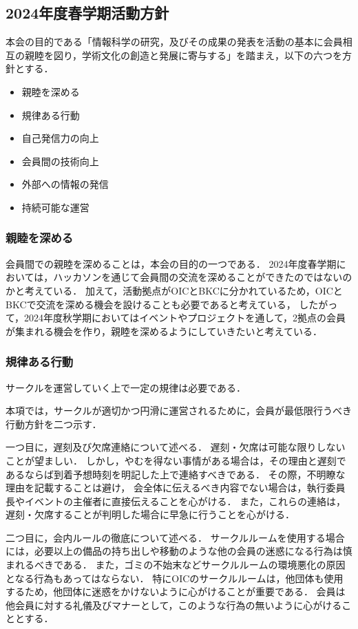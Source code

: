 \subsection*{2024年度春学期活動方針}


本会の目的である「情報科学の研究，及びその成果の発表を活動の基本に会員相互の親睦を図り，学術文化の創造と発展に寄与する」を踏まえ，以下の六つを方針とする．


\begin{itemize}
    \item 親睦を深める
    \item 規律ある行動
    \item 自己発信力の向上
    \item 会員間の技術向上
    \item 外部への情報の発信
    \item 持続可能な運営
\end{itemize}

\subsubsection*{親睦を深める}
会員間での親睦を深めることは，本会の目的の一つである．
2024年度春学期においては，ハッカソンを通じて会員間の交流を深めることができたのではないのかと考えている．
加えて，活動拠点がOICとBKCに分かれているため，OICとBKCで交流を深める機会を設けることも必要であると考えている，
したがって，2024年度秋学期においてはイベントやプロジェクトを通して，2拠点の会員が集まれる機会を作り，親睦を深めるようにしていきたいと考えている．

\subsubsection*{規律ある行動}
サークルを運営していく上で一定の規律は必要である．

本項では，サークルが適切かつ円滑に運営されるために，会員が最低限行うべき行動方針を二つ示す．

一つ目に，遅刻及び欠席連絡について述べる．
遅刻・欠席は可能な限りしないことが望ましい．
しかし，やむを得ない事情がある場合は，その理由と遅刻であるならば到着予想時刻を明記した上で連絡すべきである．
その際，不明瞭な理由を記載することは避け，
会全体に伝えるべき内容でない場合は，執行委員長やイベントの主催者に直接伝えることを心がける．
また，これらの連絡は，遅刻・欠席することが判明した場合に早急に行うことを心がける．

二つ目に，会内ルールの徹底について述べる．
サークルルームを使用する場合には，必要以上の備品の持ち出しや移動のような他の会員の迷惑になる行為は慎まれるべきである．
また，ゴミの不始末などサークルルームの環境悪化の原因となる行為もあってはならない．
特にOICのサークルルームは，他団体も使用するため，他団体に迷惑をかけないように心がけることが重要である．
会員は他会員に対する礼儀及びマナーとして，このような行為の無いように心がけることとする．

